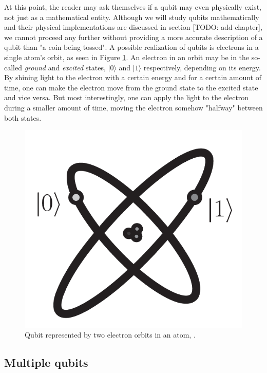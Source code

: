 At this point, the reader may ask themselves if a qubit may even physically exist, not just as a mathematical entity. Although we will study qubits mathematically and their physical implementations are discussed in section [TODO: add chapter], we cannot proceed any further without providing a more accurate description of a qubit than "a coin being tossed". A possible realization of qubits is electrons in a single atom's orbit, as seen in Figure \ref{fig 1.1}. An electron in an orbit may be in the so-called \emph{ground} and \emph{excited} states, $|0\rangle$ and $|1\rangle$ respectively, depending on its energy. By shining light to the electron with a certain energy and for a certain amount of time, one can make the electron move from the ground state to the excited state and vice versa. But most interestingly, one can apply the light to the electron during a smaller amount of time, moving the electron somehow "halfway" between both states.


\begin{figure}[h]
	\includegraphics[scale=.4]{../imgs/atom.png}
	\centering
	\caption{Qubit represented by two electron orbits in an atom, \cite{Nielsen2002}.}
	\label{fig 1.1}
\end{figure}

\subsection{Multiple qubits}

